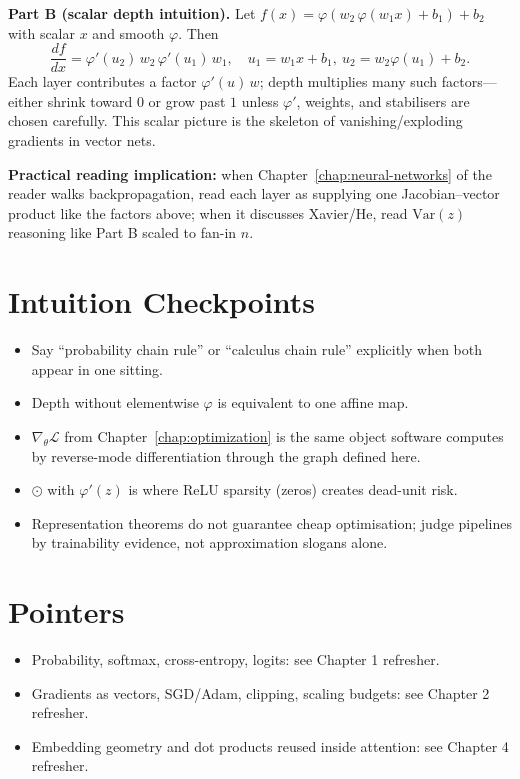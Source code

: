 \textbf{Part B (scalar depth intuition).} Let \(f(x)=\varphi(w_2\,\varphi(w_1 x)+b_1)+b_2\) with scalar \(x\) and smooth \(\varphi\). Then
\[
\frac{df}{dx}= \varphi'(u_2)\, w_2\, \varphi'(u_1)\, w_1,\quad u_1=w_1 x+b_1,\ u_2=w_2 \varphi(u_1)+b_2.
\]
Each layer contributes a factor \(\varphi'(u)\, w\); depth multiplies many such factors---either shrink toward \(0\) or grow past \(1\) unless \(\varphi'\), weights, and stabilisers are chosen carefully. This scalar picture is the skeleton of vanishing/exploding gradients in vector nets.

\textbf{Practical reading implication:} when Chapter~\ref{chap:neural-networks} of the reader walks backpropagation, read each layer as supplying one Jacobian--vector product like the factors above; when it discusses Xavier/He, read \(\mathrm{Var}(z)\) reasoning like Part B scaled to fan-in \(n\).

\section*{Intuition Checkpoints}
\begin{itemize}[leftmargin=1.5em]
  \item Say ``probability chain rule'' or ``calculus chain rule'' explicitly when both appear in one sitting.
  \item Depth without elementwise \(\varphi\) is equivalent to one affine map.
  \item \(\nabla_\theta \mathcal{L}\) from Chapter~\ref{chap:optimization} is the same object software computes by reverse-mode differentiation through the graph defined here.
  \item \(\odot\) with \(\varphi'(z)\) is where ReLU sparsity (zeros) creates dead-unit risk.
  \item Representation theorems do not guarantee cheap optimisation; judge pipelines by trainability evidence, not approximation slogans alone.
\end{itemize}

\section*{Pointers}
\begin{itemize}[leftmargin=1.5em]
  \item Probability, softmax, cross-entropy, logits: see Chapter 1 refresher.
  \item Gradients as vectors, SGD/Adam, clipping, scaling budgets: see Chapter 2 refresher.
  \item Embedding geometry and dot products reused inside attention: see Chapter 4 refresher.
\end{itemize}

